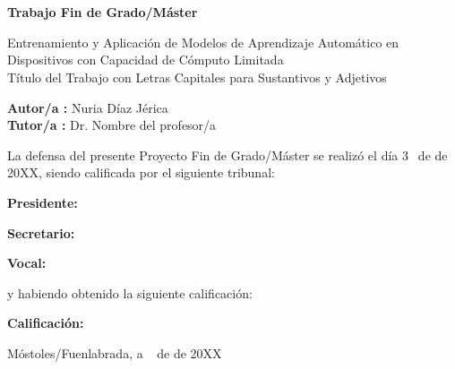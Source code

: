 \documentclass[a4paper, 12pt]{book}
\begin{document}
\newpage
\mbox{}
\thispagestyle{empty} %


\clearpage
{}
\chapter*{}

\vspace{-4cm}
\begin{center}
\LARGE
\textbf{Trabajo Fin de Grado/Máster}

\vspace{1cm}
\large
Entrenamiento y Aplicación de Modelos de Aprendizaje Automático en Dispositivos con Capacidad de Cómputo Limitada\\
Título del Trabajo con Letras Capitales para Sustantivos y Adjetivos

\vspace{1cm}
\large
\textbf{Autor/a :} Nuria Díaz Jérica  \\
\textbf{Tutor/a :} Dr. Nombre del profesor/a

\end{center}

\vspace{1cm}
La defensa del presente Proyecto Fin de Grado/Máster se realizó el día 3\qquad$\;\,$ de
\qquad\qquad\qquad\qquad \newline de 20XX, siendo calificada por el siguiente tribunal:


\vspace{0.5cm}
\textbf{Presidente:}

\vspace{0.8cm}
\textbf{Secretario:}

\vspace{0.8cm}
\textbf{Vocal:}


\vspace{0.8cm}
y habiendo obtenido la siguiente calificación:

\vspace{0.8cm}
\textbf{Calificación:}


\vspace{0.8cm}
\begin{flushright}
Móstoles/Fuenlabrada, a \qquad$\;\,$ de \qquad\qquad\qquad\qquad de 20XX
\end{flushright}

\end{document}
